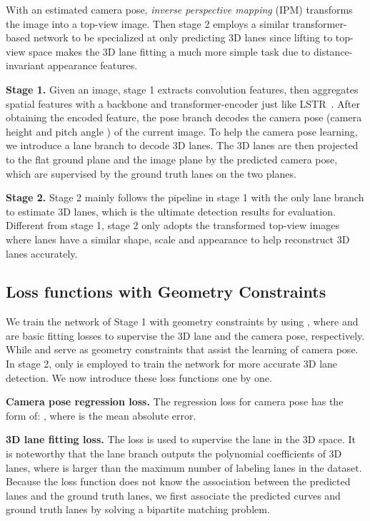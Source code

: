 \documentclass[letterpaper]{article} \usepackage{aaai22}  \usepackage{times}  \usepackage{helvet}  \usepackage{courier}  \usepackage[hyphens]{url}  \usepackage{graphicx} \urlstyle{rm} \def\UrlFont{\rm}  \usepackage{natbib}  \usepackage{caption}
\begin{document}
With an estimated camera pose, \textit{inverse perspective mapping} (IPM) transforms the image into a top-view image. Then stage 2 employs a similar transformer-based network to be specialized at only predicting 3D lanes since lifting to top-view space makes the 3D lane fitting a much more simple task due to distance-invariant appearance features.   


\noindent \textbf{Stage 1.}
Given an image, stage 1 extracts convolution features, then aggregates spatial features with a backbone and transformer-encoder just like LSTR~\cite{LSTR}. After obtaining the encoded feature, the pose branch decodes the camera pose (camera height  and pitch angle  ) of the current image. To help the camera pose learning, we introduce a lane branch to decode 3D lanes. The 3D lanes are then projected to the flat ground plane and the image plane by the predicted camera pose, which are supervised by the ground truth lanes on the two planes.


\noindent \textbf{Stage 2.} 
Stage 2 mainly follows the pipeline in stage 1 with the only lane branch to estimate 3D lanes, which is the ultimate detection results for evaluation. Different from stage 1,  stage 2 only adopts the transformed top-view images where lanes have a similar shape, scale and appearance to help reconstruct 3D lanes accurately.


\subsection{Loss functions with Geometry Constraints}

We train the network of Stage 1 with geometry constraints by using , where  and  are basic fitting losses to supervise the 3D lane and the camera pose, respectively. While  and  serve as geometry constraints that assist the learning of camera pose. In stage 2, only  is employed to train the network for more accurate 3D lane detection. We now introduce these loss functions one by one. 


\noindent \textbf{Camera pose regression loss.}
The regression loss for camera pose has the form of: , where  is the mean absolute error.



\noindent \textbf{3D lane fitting loss.}
The loss is used to supervise the lane in the 3D space. It is noteworthy that the lane branch outputs the polynomial coefficients of  3D lanes,  where  is larger than the maximum number of labeling lanes in the dataset. Because the loss function does not know the association between the predicted lanes and the ground truth lanes, we first associate the predicted curves and ground truth lanes by solving a bipartite matching problem.
\end{document}
